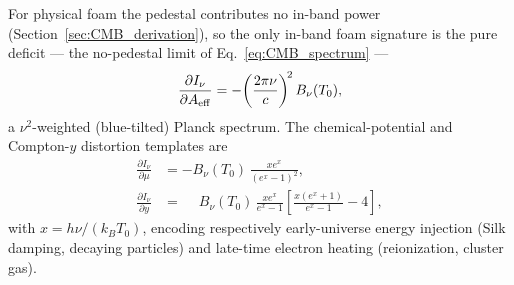 \documentclass[aps,prd,onecolumn,amsmath,amssymb]{revtex4-2}
\begin{document}
For physical foam the pedestal contributes no in-band power
(Section~\ref{sec:CMB_derivation}), so the only in-band foam signature is
the pure deficit --- the no-pedestal limit of Eq.~\eqref{eq:CMB_spectrum} ---
\begin{equation}
  \frac{\partial I_\nu}{\partial A_{\rm eff}}
    = -\!\left(\frac{2\pi\nu}{c}\right)^{\!2} B_\nu(T_0),
  \label{eq:dIdA_phys}
\end{equation}
a $\nu^2$-weighted (blue-tilted) Planck spectrum.  The
chemical-potential and Compton-$y$ distortion templates are
\begin{align}
  \frac{\partial I_\nu}{\partial\mu}
    &= -B_\nu(T_0)\,\frac{x e^x}{(e^x-1)^2}, \label{eq:dIdmu}\\
  \frac{\partial I_\nu}{\partial y}
    &= \phantom{-}B_\nu(T_0)\,\frac{x e^x}{e^x-1}
       \!\left[\frac{x(e^x+1)}{e^x-1}-4\right], \label{eq:dIdy}
\end{align}
with $x=h\nu/(k_B T_0)$, encoding respectively early-universe energy
injection (Silk damping, decaying particles) and late-time electron
heating (reionization, cluster gas).
\end{document}
